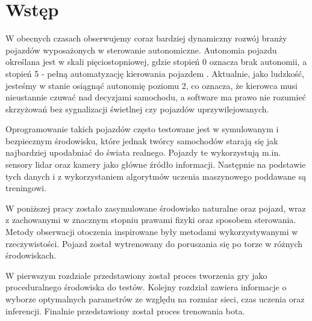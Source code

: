 \chapter*{Wstęp}
W obecnych czasach obserwujemy coraz bardziej dynamiczny rozwój branży pojazdów wyposażonych w sterowanie autonomiczne. Autonomia pojazdu określana jest w skali pięciostopniowej, gdzie stopień 0 oznacza brak autonomii, a stopień 5 - pełną automatyzację kierowania pojazdem \cite{SAE}. Aktualnie, jako ludzkość, jesteśmy w stanie osiągnąć autonomię poziomu 2, co oznacza, że kierowca musi nieustannie czuwać nad decyzjami samochodu, a software ma prawo nie rozumieć skrzyżowań bez sygnalizacji świetlnej czy pojazdów uprzywilejowanych.

Oprogramowanie takich pojazdów często testowane jest w symulowanym i bezpiecznym środowisku, które jednak twórcy samochodów starają się jak najbardziej upodabniać do świata realnego. Pojazdy te wykorzystują m.in. sensory lidar\cite{Lidar} oraz kamery jako główne źródło informacji. Następnie na podstawie tych danych i z wykorzystaniem algorytmów uczenia maszynowego poddawane są treningowi.

W poniższej pracy zostało zasymulowane środowisko naturalne oraz pojazd, wraz z zachowanymi w znacznym stopniu prawami fizyki oraz sposobem sterowania. Metody obserwacji otoczenia inspirowane były metodami wykorzystywanymi w rzeczywistości. Pojazd został wytrenowany do poruszania się po torze w różnych środowiskach.

W pierwszym rozdziale przedstawiony został proces tworzenia gry jako proceduralnego środowiska do testów. Kolejny rozdział zawiera informacje o wyborze optymalnych parametrów ze względu na rozmiar sieci, czas uczenia oraz inferencji. Finalnie przedstawiony został proces trenowania bota.
